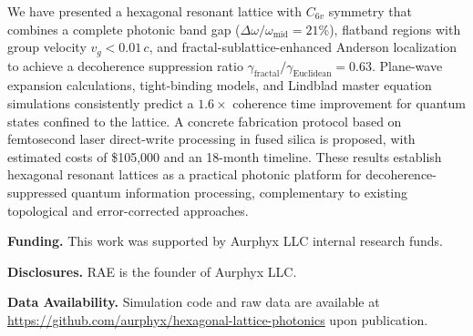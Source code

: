 \documentclass[10pt,letterpaper]{article}
\begin{document}
We have presented a hexagonal resonant lattice with $C_{6v}$ symmetry that combines a complete photonic band gap ($\Delta\omega/\omega_\mathrm{mid} = 21\%$), flatband regions with group velocity $v_g < 0.01\,c$, and fractal-sublattice-enhanced Anderson localization to achieve a decoherence suppression ratio $\gamma_\mathrm{fractal}/\gamma_\mathrm{Euclidean} = 0.63$. Plane-wave expansion calculations, tight-binding models, and Lindblad master equation simulations consistently predict a $1.6\times$ coherence time improvement for quantum states confined to the lattice. A concrete fabrication protocol based on femtosecond laser direct-write processing in fused silica is proposed, with estimated costs of \$105,000 and an 18-month timeline. These results establish hexagonal resonant lattices as a practical photonic platform for decoherence-suppressed quantum information processing, complementary to existing topological and error-corrected approaches.

\bigskip

\noindent\textbf{Funding.} This work was supported by Aurphyx LLC internal research funds.

\noindent\textbf{Disclosures.} RAE is the founder of Aurphyx LLC.

\noindent\textbf{Data Availability.} Simulation code and raw data are available at \url{https://github.com/aurphyx/hexagonal-lattice-photonics} upon publication.




\end{document}
